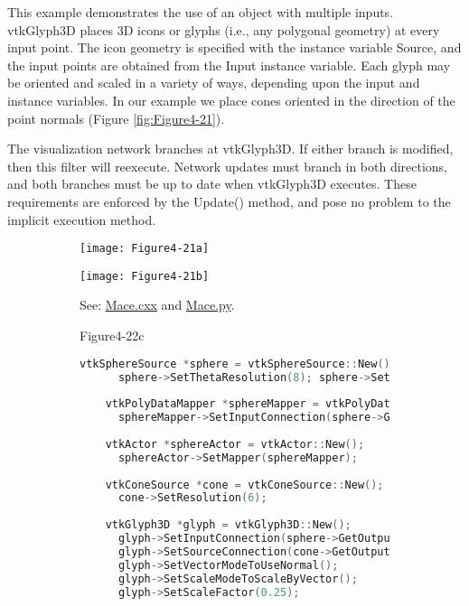\begin{description}[leftmargin=0cm,labelindent=0cm]
\item[Generating Oriented Glyphs.] This example demonstrates the use of an object with multiple inputs. vtkGlyph3D places 3D icons or glyphs (i.e., any polygonal geometry) at every input point. The icon geometry is specified with the instance variable Source, and the input points are obtained from the Input instance variable. Each glyph may be oriented and scaled in a variety of ways, depending upon the input and instance variables. In our example we place cones oriented in the direction of the point normals (Figure \ref{fig:Figure4-21}).

The visualization network branches at vtkGlyph3D. If either branch is modified, then this filter will reexecute. Network updates must branch in both directions, and both branches must be up to date when vtkGlyph3D executes. These requirements are enforced by the Update() method, and pose no problem to the implicit execution method.

\begin{figure}[htb]
  \begin{subfigure}[h]{0.64\linewidth}
    \texttt{[image: Figure4-21a]}
    \caption*{}
    \label{fig:Figure4-21a}
  \end{subfigure}
  \hfill
  \begin{subfigure}[h]{0.32\linewidth}
    \texttt{[image: Figure4-21b]}
    \caption*{See: \href{https://lorensen.github.io/VTKExamples/site/Cxx/Rendering/Mace/}{Mace.cxx} and \href{https://lorensen.github.io/VTKExamples/site/Python/Rendering/Mace/}{Mace.py}.}
    \label{fig:Figure4-21b}
  \end{subfigure}
  \hfill
  \begin{subfigure}[h]{0.96\linewidth}{Figure4-22c}
    \begin{lstlisting}[language=C++, caption={Warped Sphere.}]
    vtkSphereSource *sphere = vtkSphereSource::New();
      sphere->SetThetaResolution(8); sphere->SetPhiResolution(8);
    
    vtkPolyDataMapper *sphereMapper = vtkPolyDataMapper::New();
      sphereMapper->SetInputConnection(sphere->GetOutputPort());
    
    vtkActor *sphereActor = vtkActor::New();
      sphereActor->SetMapper(sphereMapper);
    
    vtkConeSource *cone = vtkConeSource::New();
      cone->SetResolution(6);
    
    vtkGlyph3D *glyph = vtkGlyph3D::New();
      glyph->SetInputConnection(sphere->GetOutputPort());
      glyph->SetSourceConnection(cone->GetOutputPort());
      glyph->SetVectorModeToUseNormal();
      glyph->SetScaleModeToScaleByVector();
      glyph->SetScaleFactor(0.25);
    

\end{lstlisting}
\end{subfigure}
\end{figure}
\end{description}
